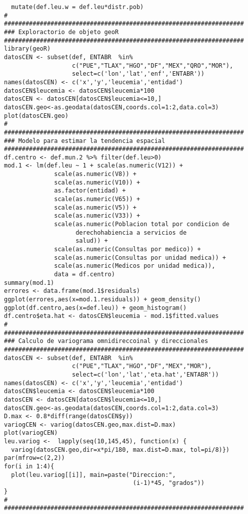 \documentclass[11pt, oneside]{book}
\begin{document}
\begin{verbatim}
  mutate(def.leu.w = def.leu*distr.pob)
#
###################################################################
### Exploractorio de objeto geoR
###################################################################
library(geoR)
datosCEN <- subset(def, ENTABR  %in% 
                   c("PUE","TLAX","HGO","DF","MEX","QRO","MOR"), 
                   select=c('lon','lat','enf','ENTABR'))
names(datosCEN) <- c('x','y','leucemia','entidad')
datosCEN$leucemia <- datosCEN$leucemia*100
datosCEN <- datosCEN[datosCEN$leucemia<=10,]
datosCEN.geo<-as.geodata(datosCEN,coords.col=1:2,data.col=3) 
plot(datosCEN.geo)
#
###################################################################
### Modelo para estimar la tendencia espacial
###################################################################
df.centro <- def.mun.2 %>% filter(def.leu>0)
mod.1 <- lm(def.leu ~ 1 + scale(as.numeric(V12)) +
              scale(as.numeric(V8)) + 
              scale(as.numeric(V10)) + 
              as.factor(entidad) + 
              scale(as.numeric(V65)) + 
              scale(as.numeric(V5)) + 
              scale(as.numeric(V33)) + 
              scale(as.numeric(Poblacion total por condicion de 
			        derechohabiencia a servicios de 
					salud)) + 
              scale(as.numeric(Consultas por medico)) + 
              scale(as.numeric(Consultas por unidad medica)) + 
              scale(as.numeric(Medicos por unidad medica)), 
			  data = df.centro)
summary(mod.1)
errores <- data.frame(mod.1$residuals)
ggplot(errores,aes(x=mod.1.residuals)) + geom_density()
ggplot(df.centro,aes(x=def.leu)) + geom_histogram()
df.centro$eta.hat <- datosCEN$leucemia - mod.1$fitted.values
#
###################################################################
### Calculo de variograma omnidireccoinal y direccionales
###################################################################
datosCEN <- subset(def, ENTABR  %in% 
                   c("PUE","TLAX","HGO","DF","MEX","MOR"), 
                   select=c('lon','lat','eta.hat','ENTABR'))
names(datosCEN) <- c('x','y','leucemia','entidad')
datosCEN$leucemia <- datosCEN$leucemia*100
datosCEN <- datosCEN[datosCEN$leucemia<=10,]
datosCEN.geo<-as.geodata(datosCEN,coords.col=1:2,data.col=3) 
D.max <- 0.8*diff(range(datosCEN$y))
variogCEN <- variog(datosCEN.geo,max.dist=D.max)
plot(variogCEN)
leu.variog <-  lapply(seq(10,145,45), function(x) {
  variog(datosCEN.geo,dir=x*pi/180, max.dist=D.max, tol=pi/8)})
par(mfrow=c(2,2))
for(i in 1:4){
  plot(leu.variog[[i]], main=paste("Direccion:", 
                                    (i-1)*45, "grados"))
}
#
###################################################################

\end{verbatim}
\end{document}
